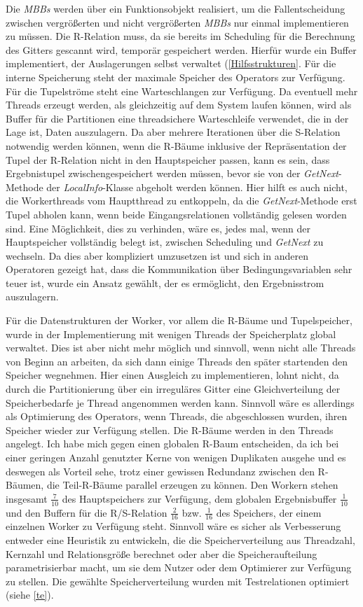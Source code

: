 \documentclass[a4paper,12pt,twoside]{article}
\newcommand{\Fb}[1]{\textit{#1}} %
\begin{document}
Die \Fb{MBBs} werden über ein Funktionsobjekt realisiert, um die Fallentscheidung zwischen vergrößerten und nicht vergrößerten \Fb{MBBs} nur einmal implementieren zu müssen. Die R-Relation muss, da sie bereits im Scheduling für die Berechnung des Gitters gescannt wird, temporär gespeichert werden. Hierfür wurde ein Buffer implementiert, der Auslagerungen selbst verwaltet (\autoref{Hilfsstrukturen}. Für die interne Speicherung steht der maximale Speicher des Operators zur Verfügung. Für die Tupelströme steht eine Warteschlangen zur Verfügung. Da eventuell mehr Threads erzeugt werden, als gleichzeitig auf dem System laufen können, wird als Buffer für die Partitionen eine threadsichere Warteschleife verwendet, die in der Lage ist, Daten auszulagern. Da aber mehrere Iterationen über die S-Relation notwendig werden können, wenn die R-Bäume inklusive der Repräsentation der Tupel der R-Relation nicht in den Hauptspeicher passen, kann es sein, dass Ergebnistupel zwischengespeichert werden müssen, bevor sie von der \Fb{GetNext}-Methode der \Fb{LocalInfo}-Klasse abgeholt werden können. Hier hilft es auch nicht, die Workerthreads vom Hauptthread zu entkoppeln, da die \Fb{GetNext}-Methode erst Tupel abholen kann, wenn beide Eingangsrelationen vollständig gelesen worden sind. Eine Möglichkeit, dies zu verhinden, wäre es, jedes mal, wenn der Hauptspeicher vollständig belegt ist, zwischen Scheduling und \Fb{GetNext} zu wechseln. Da dies aber kompliziert umzusetzen ist und sich in anderen Operatoren gezeigt hat, dass die Kommunikation über Bedingungsvariablen sehr teuer ist, wurde ein Ansatz gewählt, der es ermöglicht, den Ergebnisstrom auszulagern.

Für die Datenstrukturen der Worker, vor allem die R-Bäume und Tupelspeicher, wurde in der Implementierung mit wenigen Threads der Speicherplatz global verwaltet. Dies ist aber nicht mehr möglich und sinnvoll, wenn nicht alle Threads von Beginn an arbeiten, da sich dann einige Threads den später startenden den Speicher wegnehmen. Hier einen Ausgleich zu implementieren, lohnt nicht, da durch die Partitionierung über ein irreguläres Gitter eine Gleichverteilung der Speicherbedarfe je Thread angenommen werden kann. Sinnvoll wäre es allerdings als Optimierung des Operators, wenn Threads, die abgeschlossen wurden, ihren Speicher wieder zur Verfügung stellen. Die R-Bäume werden in den Threads angelegt. Ich habe mich gegen einen globalen R-Baum entscheiden, da ich bei einer geringen Anzahl genutzter Kerne von wenigen Duplikaten ausgehe und es deswegen als Vorteil sehe, trotz einer gewissen Redundanz zwischen den R-Bäumen, die Teil-R-Bäume parallel erzeugen zu können. Den Workern stehen insgesamt $\frac{7}{10}$ des Hauptspeichers zur Verfügung, dem globalen Ergebnisbuffer $\frac{1}{10}$ und den Buffern für die R/S-Relation $\frac{2}{16}$ bzw. $\frac{1}{16}$ des Speichers, der einem einzelnen Worker zu Verfügung steht. Sinnvoll wäre es sicher als Verbesserung entweder eine Heuristik zu entwickeln, die die Speicherverteilung aus Threadzahl, Kernzahl und Relationsgröße berechnet oder aber die Speicheraufteilung parametrisierbar macht, um sie dem Nutzer oder dem Optimierer zur Verfügung zu stellen. Die gewählte Speicherverteilung wurden mit Testrelationen optimiert (siehe \autoref{te}). 
\end{document}
